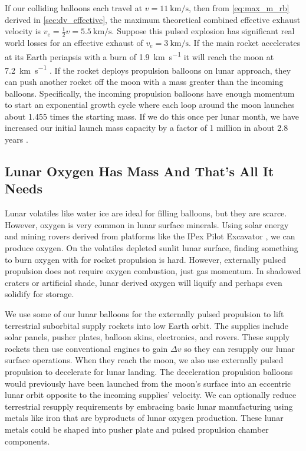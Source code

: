 \documentclass{article}
\begin{document}
{If our colliding balloons each travel at $v=\SI{11}{\kilo\meter\per\second}$, then from \autoref{eq:max_m_rb} derived in \autoref{sec:dv_effective},  the maximum theoretical combined effective exhaust velocity is $v_e = \frac{1}{2}v = \SI {5.5}{\kilo\meter\per\second}$.  Suppose this pulsed explosion has significant real world losses for an effective exhaust of $v_e = \SI{3}{\kilo\meter\per\second}$.   If the main rocket accelerates at its Earth periapsis with a burn of \SI{1.9}{\kilo\meter\per\second} it will reach the moon at \SI{7.2}{\kilo\meter\per\second} \cite{github_repo_for_paper}.   If the rocket deploys propulsion balloons on lunar approach, they can push another rocket off the moon with a mass greater than the incoming balloons. Specifically, the incoming propulsion balloons have enough momentum to start an exponential growth cycle where each loop around the moon launches about 1.455 times the starting mass.   If we do this once per lunar month, we have increased our initial launch mass capacity by a factor of 1 million in about 2.8 years \cite{github_repo_for_paper}. 

\subsection{Lunar Oxygen Has Mass And That's All It Needs}\label{sec:lunar_mining}
Lunar volatiles like water ice are ideal for filling balloons, but they are scarce.   However, oxygen is very common in lunar surface minerals.   Using solar energy and mining rovers derived from platforms like the IPex Pilot Excavator \cite{ipex_pilot_excavator}, we can produce oxygen.  On the volatiles depleted sunlit lunar surface, finding something to burn oxygen with for rocket propulsion is hard.   However, externally pulsed propulsion does not require oxygen combustion, just gas momentum.  In shadowed craters or artificial shade, lunar derived oxygen will liquify and perhaps even solidify for storage.  

We use some of our lunar balloons for the externally pulsed propulsion to lift terrestrial suborbital supply rockets into low Earth orbit.  The supplies include solar panels, pusher plates, balloon skins, electronics, and rovers. These supply rockets then use conventional engines to gain \(\Delta v\) so they can resupply our lunar surface operations.   When they reach the moon, we also use externally pulsed propulsion to decelerate for lunar landing.  The deceleration propulsion balloons would previously have been launched from the moon's surface into an eccentric lunar orbit opposite to the incoming supplies' velocity.   We can optionally reduce terrestrial resupply requirements by embracing basic lunar manufacturing using metals like iron that are byproducts of lunar oxygen production.  These lunar metals could be shaped into pusher plate and pulsed propulsion chamber components.  

}
\end{document}

